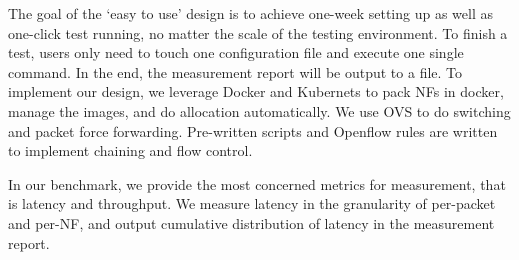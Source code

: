 The goal of the `easy to use' design is to
achieve one-week setting up as well as one-click test running,
no matter the scale of the testing environment.
To finish a test, users only need to touch one configuration file
and execute one single command.
In the end, the measurement report will be output to a file.
To implement our design,
we leverage Docker and Kubernets to pack NFs in docker,
manage the images, and do allocation automatically.
We use OVS to do switching and packet force forwarding.
Pre-written scripts and Openflow rules are written
to implement chaining and flow control.

In our benchmark, we provide the most concerned metrics for measurement,
that is latency and throughput.
We measure latency in the granularity of per-packet and per-NF,
and output cumulative distribution of latency in the measurement report.


%
%
